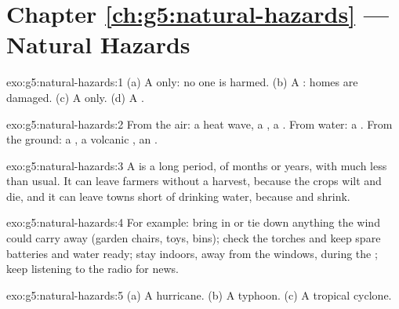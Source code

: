 \section*{Chapter \ref{ch:g5:natural-hazards} --- Natural Hazards}

\begin{solution}{exo:g5:natural-hazards:1}
(a) A  only: no one is harmed. (b) A : homes
are damaged. (c) A  only. (d) A .
\end{solution}

\begin{solution}{exo:g5:natural-hazards:2}
From the air: a heat wave, a , a . From water: a . From
the ground: a , a volcanic , an .
\end{solution}

\begin{solution}{exo:g5:natural-hazards:3}
A  is a long period, of months or years, with much less  than
usual. It can leave farmers without a harvest, because the crops wilt and
die, and it can leave towns short of drinking water, because  and
 shrink.
\end{solution}

\begin{solution}{exo:g5:natural-hazards:4}
For example: bring in or tie down anything the wind could carry away
(garden chairs, toys, bins); check the torches and keep spare batteries and
water ready; stay indoors, away from the windows, during the ; keep
listening to the radio for news.
\end{solution}

\begin{solution}{exo:g5:natural-hazards:5}
(a) A hurricane. (b) A typhoon. (c) A tropical cyclone.
\end{solution}

